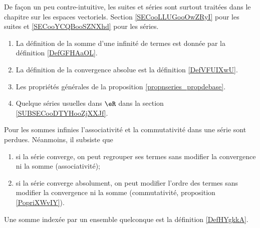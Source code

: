 
De façon un peu contre-intuitive, les suites et séries sont surtout traitées dans le chapitre sur les espaces vectoriels. Section \ref{SECooLLUGooOwZRyI} pour les suites et \ref{SECooYCQBooSZNXhd} pour les séries.

\begin{enumerate}
    \item
        La définition de la somme d'une infinité de termes est donnée par la définition \ref{DefGFHAaOL}.
    \item
        La définition de la convergence absolue est la définition \ref{DefVFUIXwU}.
    \item
        Les propriétés générales de la proposition \ref{propnseries_propdebase}.
    \item
        Quelque séries usuelles dans \( \eR\) dans la section \ref{SUBSECooDTYHooZjXXJf}.
\end{enumerate}

    Pour les sommes infinies l'associativité et la commutativité dans une série sont perdues. Néanmoins, il subsiste que
  \begin{enumerate}
  \item 
      si la série converge, on peut regrouper ses termes sans modifier la convergence ni la somme (associativité);
  \item
      si la série converge absolument, on peut modifier l'ordre des termes sans modifier la convergence ni la somme (commutativité, proposition \ref{PopriXWvIY}).
  \end{enumerate}

Une somme indexée par un ensemble quelconque est la définition \ref{DefHYgkkA}.

